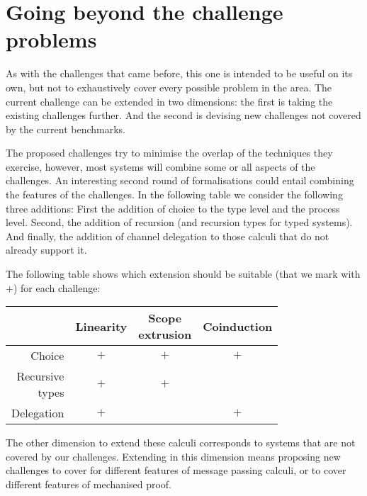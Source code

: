 \documentclass[runningheads]{llncs}
\begin{document}
\section{Going beyond the challenge problems}\label{sec:going-beyond}

As with the challenges that came before, this one is intended to be
useful on its own, but not to exhaustively cover every possible
problem in the area. The current challenge can be extended in two
dimensions: the first is taking the existing challenges further.
And the second is devising new challenges not covered by the current
benchmarks.

The proposed challenges try to minimise the overlap of the techniques
they exercise, however, most systems will combine some or all aspects
of the challenges. An interesting second round of formalisations could
entail combining the features of the challenges. In the following
table we consider the following three additions: First the addition of
choice to the type level and the process level. Second, the addition
of recursion (and recursion types for typed systems). And finally, the
addition of channel delegation to those calculi that do not already
support it.

The following table shows which extension should be suitable (that we
mark with $+$) for each challenge:

\vspace{.5em}

\begin{center}\small
  \begin{tabular}{|r|c|c|c|}
    \hline
    & Linearity & \shortstack{Scope \\ extrusion} & Coinduction \\
    \hline
    Choice & $+$ & $+$  & $+$ \\
    \hline
    \shortstack{Recursive \\ types} & $+$  & $+$ & \\
    \hline
    Delegation & $+$ & & $+$ \\
    \hline
  \end{tabular}
\end{center}

\vspace{.5em}

The other dimension to extend these calculi corresponds to systems
that are not covered by our challenges. Extending in this dimension
means proposing new challenges to cover for different features of
message passing calculi, or to cover different features of mechanised
proof.
\end{document}
